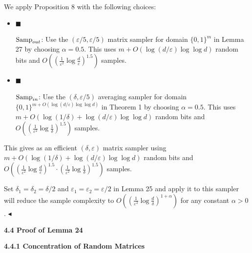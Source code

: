 We apply Proposition 8 with the following choices:\par


\begin{itemize}


\item[] 
$\blacksquare$ 


$\textup{{Samp}}_{out}$: Use the $(\varepsilon/5,\varepsilon/5)$ matrix sampler for domain $\{0,1\}^{m}$ in Lemma 27 by choosing $\alpha=0.5$. This uses $m+O(\log(d/\varepsilon)\log\log d)$ random bits and $O((\frac{1}{\varepsilon^{2}}\log\frac{d}{\varepsilon})^{1.5})$ samples.\par





\item[] 
$\blacksquare$ 


$\textup{{Samp}}_{in}$: Use the $(\delta,\varepsilon/5)$ averaging sampler for domain $\{0,1\}^{m+O(\log(d/\varepsilon)\log\log d)}$ in Theorem 1 by choosing $\alpha=0.5$. This uses $m+O(\log(1/\delta)+\log(d/\varepsilon)\log\log d)$ random bits and $O((\frac{1}{\varepsilon^{2}}\log\frac{1}{\delta})^{1.5})$ samples.\par





\end{itemize}


This gives as an efficient $(\delta,\varepsilon)$ matrix sampler using $m+O(\log(1/\delta)+\log(d/\varepsilon)\log\log d)$ random bits and $O((\frac{1}{\varepsilon^{2}}\log\frac{d}{\varepsilon})^{1.5}\cdot(\frac{1}{\varepsilon^{2}}\log\frac{1}{\delta})^{1.5})$ samples.\par




Set $\delta_{1}=\delta_{2}=\delta/2$ and $\varepsilon_{1}=\varepsilon_{2}=\varepsilon/2$ in Lemma 25 and apply it to this sampler will reduce the sample complexity to $O((\frac{1}{\varepsilon^{2}}\log\frac{d}{\delta})^{1+\alpha})$ for any constant $\alpha>0$.
$\blacktriangleleft$\par






\par\medskip\noindent\textbf{
4.4 Proof of Lemma 24
}\par




\par\medskip\noindent\textbf{
4.4.1 Concentration of Random Matrices}\par





